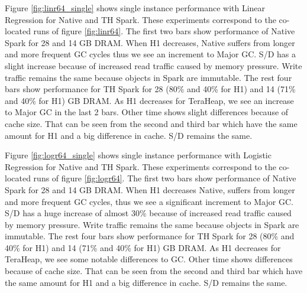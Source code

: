 Figure \ref{fig:linr64_single} shows single instance performance with Linear Regression for Native and TH Spark. These experiments correspond to the co-located runs of figure \ref{fig:linr64}. The first two bars show performance of Native Spark for 28 and 14 GB DRAM. When H1 decreases, Native suffers from longer and more frequent GC cycles thus we see an increment to Major GC. S/D has a slight increase because of increased read traffic caused by memory pressure. Write traffic remains the same because objects in Spark are immutable. The rest four bars show performance for TH Spark for 28 (80\% and 40\% for H1) and 14 (71\% and 40\% for H1) GB DRAM. As H1 decreases for TeraHeap, we see an increase to Major GC in the last 2 bars. Other time shows slight differences because of cache size. That can be seen from the second and third bar which have the same amount for H1 and a big difference in cache. S/D remains the same.

Figure \ref{fig:logr64_single} shows single instance performance with Logistic Regression for Native and TH Spark. These experiments correspond to the co-located runs of figure \ref{fig:logr64}. The first two bars show performance of Native Spark for 28 and 14 GB DRAM. When H1 decreases Native, suffers from longer and more frequent GC cycles, thus we see a significant increment to Major GC. S/D has a huge increase of almost 30\% because of increased read traffic caused by memory pressure. Write traffic remains the same because objects in Spark are immutable. The rest four bars show performance for TH Spark for 28 (80\% and 40\% for H1) and 14 (71\% and 40\% for H1) GB DRAM. As H1 decreases for TeraHeap, we see some notable differences to GC. Other time shows differences because of cache size. That can be seen from the second and third bar which have the same amount for H1 and a big difference in cache. S/D remains the same.

